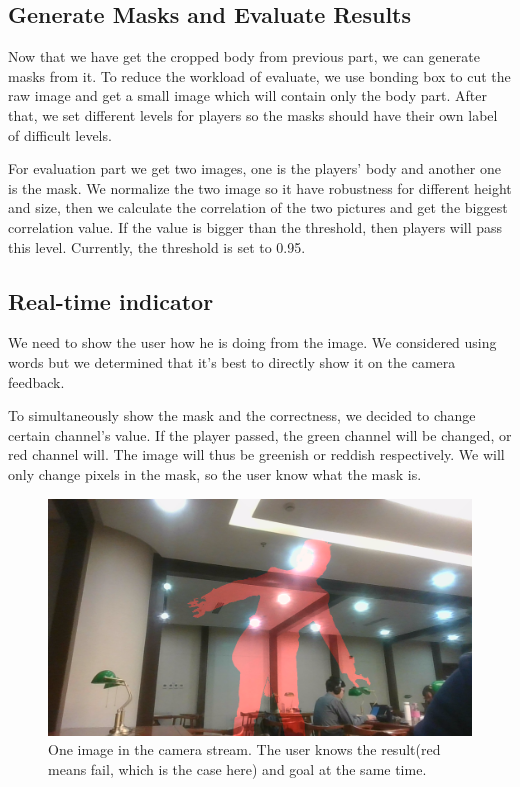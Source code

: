 \documentclass[conference,compsoc]{IEEEtran}
\begin{document}
	\subsection{Generate Masks and Evaluate Results}
		Now that we have get the cropped body from previous part, we can generate masks from it.
		To reduce the workload of evaluate, we use bonding box to cut the raw image and get a small image which will contain only the body part.
		After that, we set different levels for players so the masks should have their own label of difficult levels.
	\par
		For evaluation part we get two images, one is the players' body and another one is the mask.
		We normalize the two image so it have robustness for different height and size, then we calculate the correlation of the two pictures and get the biggest correlation value.
		If the value is bigger than the threshold, then players will pass this level.
		Currently, the threshold is set to 0.95.
	\subsection{Real-time indicator}
	\par
		We need to show the user how he is doing from the image. We considered using words but we determined that it's best to directly show it on the camera feedback.
	\par
		To simultaneously show the mask and the correctness, we decided to change certain channel's value.
		If the player passed, the green channel will be changed, or red channel will. The image will thus be greenish or reddish respectively.
		We will only change pixels in the mask, so the user know what the mask is.
		\begin{figure}[h]
			\centering
			\includegraphics[width=\linewidth]{./Pic/level.png}
			\caption{One image in the camera stream. The user knows the result(red means fail, which is the case here) and goal at the same time.}
		\end{figure}
\end{document}
